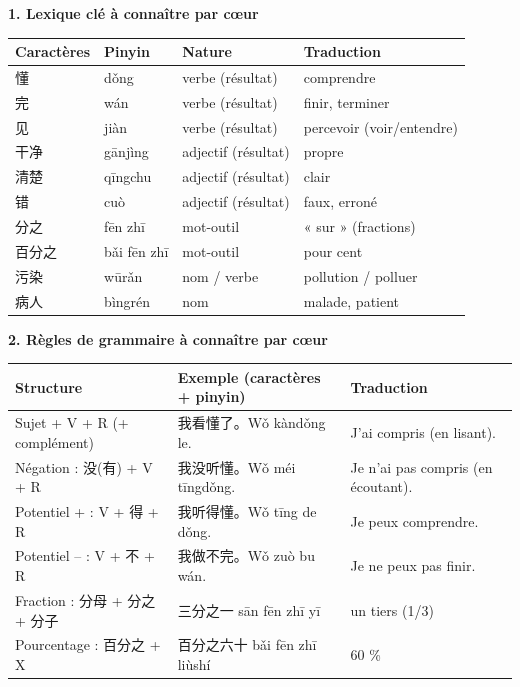 \documentclass[11pt]{article}
\begin{document}
\begin{bilan}
\textbf{1. Lexique clé à connaître par cœur}
\begin{center}
\begin{tabularx}{\linewidth}{|X|X|X|X|}
\hline
\rowcolor{popblueL} Caractères & Pinyin & Nature & Traduction \\
\hline
懂 & dǒng & verbe (résultat) & comprendre \\
\hline
完 & wán & verbe (résultat) & finir, terminer \\
\hline
见 & jiàn & verbe (résultat) & percevoir (voir/entendre) \\
\hline
干净 & gānjìng & adjectif (résultat) & propre \\
\hline
清楚 & qīngchu & adjectif (résultat) & clair \\
\hline
错 & cuò & adjectif (résultat) & faux, erroné \\
\hline
分之 & fēn zhī & mot-outil & « sur » (fractions) \\
\hline
百分之 & bǎi fēn zhī & mot-outil & pour cent \\
\hline
污染 & wūrǎn & nom / verbe & pollution / polluer \\
\hline
病人 & bìngrén & nom & malade, patient \\
\hline
\end{tabularx}
\end{center}

\textbf{2. Règles de grammaire à connaître par cœur}
\begin{center}
\begin{tabularx}{\linewidth}{|X|X|X|}
\hline
\rowcolor{popblueL} Structure & Exemple (caractères + pinyin) & Traduction \\
\hline
Sujet + V + R (+ complément) & 我看懂了。Wǒ kàndǒng le. & J'ai compris (en lisant). \\
\hline
Négation : 没(有) + V + R & 我没听懂。Wǒ méi tīngdǒng. & Je n'ai pas compris (en écoutant). \\
\hline
Potentiel + : V + 得 + R & 我听得懂。Wǒ tīng de dǒng. & Je peux comprendre. \\
\hline
Potentiel -- : V + 不 + R & 我做不完。Wǒ zuò bu wán. & Je ne peux pas finir. \\
\hline
Fraction : 分母 + 分之 + 分子 & 三分之一 sān fēn zhī yī & un tiers (1/3) \\
\hline
Pourcentage : 百分之 + X & 百分之六十 bǎi fēn zhī liùshí & 60 \% \\
\hline
\end{tabularx}
\end{center}


\end{bilan}
\end{document}
